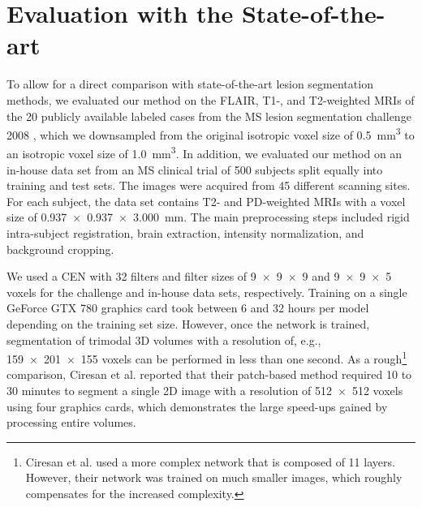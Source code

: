 \section{Evaluation with the State-of-the-art}

To allow for a direct comparison with state-of-the-art lesion segmentation
methods, we evaluated our method on the FLAIR, T1-, and T2-weighted MRIs of the
20 publicly available labeled cases from the MS lesion segmentation challenge
2008 \cite{styner20083d}, which we downsampled from the original isotropic voxel
size of \SI{0.5}{\cubic\milli\metre} to an isotropic voxel size of
\SI{1.0}{\cubic\milli\metre}. In addition, we evaluated our method on an
in-house data set from an MS clinical trial of 500 subjects split equally into
training and test sets. The images were acquired from 45 different scanning
sites. For each subject, the data set contains T2- and PD-weighted MRIs with a
voxel size of \SI{0.937x0.937x3.000}{\milli\metre}. The main preprocessing steps
included rigid intra-subject registration, brain extraction, intensity
normalization, and background cropping.

We used a CEN with 32 filters and filter sizes of \num{9x9x9} and \num{9x9x5}
voxels for the challenge and in-house data sets, respectively. Training on a
single GeForce GTX 780 graphics card took between 6 and 32 hours per model
depending on the training set size. However, once the network is trained,
segmentation of trimodal 3D volumes with a resolution of, e.g.,
\num{159x201x155} voxels can be performed in less than one second. As a
rough\footnote{Ciresan et al. used a more complex network that is composed of 11
layers. However, their network was trained on much smaller images, which roughly
compensates for the increased complexity.} comparison, Ciresan et al.
\cite{Ciresan2012} reported that their patch-based method required 10 to 30
minutes to segment a single 2D image with a resolution of \num{512x512} voxels
using four graphics cards, which demonstrates the large speed-ups gained by
processing entire volumes.

